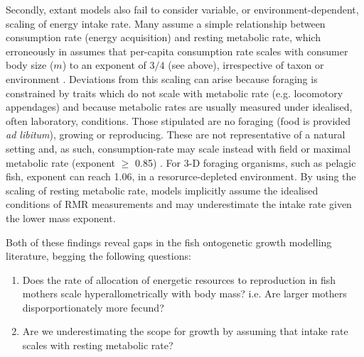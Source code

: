 \documentclass[a4paper]{article} %
\begin{document}
    Secondly, extant models also fail to consider variable, or environment-dependent, scaling of energy intake rate. Many assume a simple relationship between consumption rate (energy acquisition) and resting metabolic rate, which erroneously in assumes that per-capita consumption rate scales with consumer body size ($m$) to an exponent of $3/4$ (see above), irrespective of taxon or environment \autocite{Pawar2012}. Deviations from this scaling can arise because foraging is constrained by traits which do not scale with metabolic rate (e.g. locomotory appendages) and because metabolic rates are usually measured under idealised, often laboratory, conditions. Those stipulated are no foraging (food is provided \textit{ad libitum}), growing or reproducing. These are not representative of a natural setting and, as such, consumption-rate may scale instead with field or maximal metabolic rate (exponent $\geq$ 0.85) \autocite{peters1983,Weibel2004, Pawar2012}. For 3-D foraging organisms, such as pelagic fish, exponent can reach 1.06, in a resorurce-depleted environment. By using the scaling of resting metabolic rate, models implicitly assume the idealised conditions of RMR measurements and may underestimate the intake rate given the lower mass exponent.
    
    Both of these findings reveal gaps in the fish ontogenetic growth modelling literature, begging the following questions:
    \begin{enumerate}
        \item Does the rate of allocation of energetic resources to reproduction in fish mothers scale hyperallometrically with body mass? i.e. Are larger mothers disporportionately more fecund?
        \item Are we underestimating the scope for growth by assuming that intake rate scales with resting metabolic rate?
    \end{enumerate}
        
\end{document}
